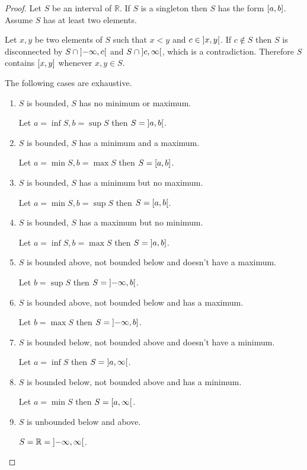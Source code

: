 \begin{proof}
	Let $S$ be an interval of $\mathbb{R}$. If $S$ is a singleton then $S$ has the form $\left[{a, b}\right]$. Assume $S$ has at least two elements.

	Let $x, y$ be two elements of $S$ such that $x < y$ and $c \in \left]{x, y}\right[$. If $c \notin S$ then $S$ is disconnected by $S \cap \left]{-\infty, c}\right[$ and $S \cap \left]{c, \infty}\right[$, which is a contradiction. Therefore $S$ contains $\left[{x, y}\right]$ whenever $x, y\in S$.

	The following cases are exhaustive.
	\begin{enumerate}[label={\textbf{Case \arabic*.}}, itemindent=1cm, itemsep=0pt]
		\item $S$ is bounded, $S$ has no minimum or maximum.

		      Let $a = \inf S, b = \sup S$ then $S = \left]{a, b}\right[$.
		\item $S$ is bounded, $S$ has a minimum and a maximum.

		      Let $a = \min S, b = \max S$ then $S = \left[{a, b}\right]$.
		\item $S$ is bounded, $S$ has a minimum but no maximum.

		      Let $a = \min S, b = \sup S$ then $S = \left[{a, b}\right[$.
		\item $S$ is bounded, $S$ has a maximum but no minimum.

		      Let $a = \inf S, b = \max S$ then $S = \left]{a, b}\right]$.
		\item $S$ is bounded above, not bounded below and doesn't have a maximum.

		      Let $b = \sup S$ then $S = \left]{-\infty, b}\right[$.
		\item $S$ is bounded above, not bounded below and has a maximum.

		      Let $b = \max S$ then $S = \left]{-\infty, b}\right]$.
		\item $S$ is bounded below, not bounded above and doesn't have a minimum.

		      Let $a = \inf S$ then $S = \left]{a, \infty}\right[$.
		\item $S$ is bounded below, not bounded above and has a minimum.

		      Let $a = \min S$ then $S = \left[{a, \infty}\right[$.
		\item $S$ is unbounded below and above.

		      $S = \mathbb{R} = \left]{-\infty, \infty}\right[$.
	\end{enumerate}


\end{proof}
